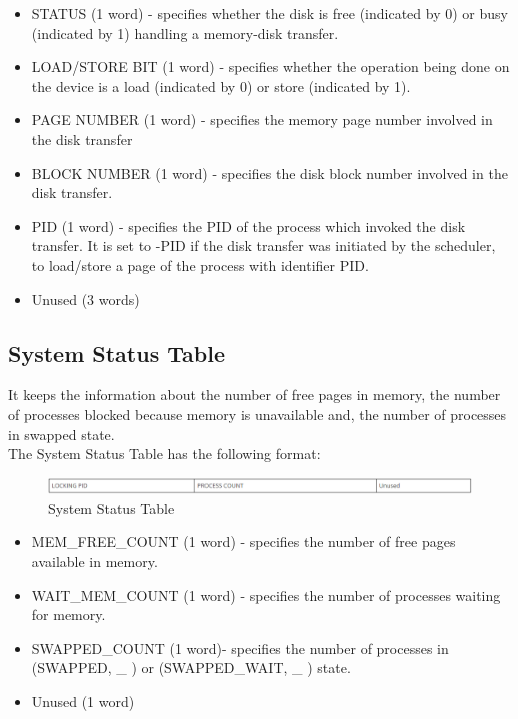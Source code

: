 \begin {itemize}

\item STATUS (1 word) - specifies whether the disk is free (indicated by 0) or busy (indicated by 1) handling a memory-disk transfer.
\item LOAD/STORE BIT (1 word) - specifies whether the operation being done on the device is a load (indicated by 0) or store (indicated by 1).
\item PAGE NUMBER (1 word) - specifies the memory page number involved in the disk transfer
\item BLOCK NUMBER (1 word) - specifies the disk block number involved in the disk transfer.
\item PID (1 word) - specifies the PID of the process which invoked the disk transfer. It is set to -PID if the disk transfer was initiated by the scheduler, to load/store a page of the process with identifier PID.
\item Unused (3 words)

\end {itemize}

\subsection {System Status Table}
It keeps the information about the number of free pages in memory, the number of processes blocked because memory is unavailable and, the number of processes in swapped state. 
\\
The System Status Table has the following format:

\begin{figure}[ht]
\centering
\includegraphics  [scale=0.55]{figures/st.png}
\caption{\footnotesize System Status Table}
\end{figure}
\begin {itemize}
\item MEM\_FREE\_COUNT (1 word) - specifies the number of free pages available in memory.
\item WAIT\_MEM\_COUNT (1 word) - specifies the number of processes waiting for memory.
\item SWAPPED\_COUNT (1 word)- specifies the number of processes in (SWAPPED, \_ ) or (SWAPPED\_WAIT, \_ ) state.
\item Unused (1 word)
\end {itemize}

